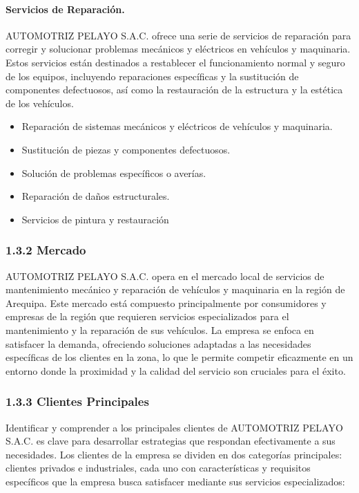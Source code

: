 \paragraph{Servicios de Reparación. }AUTOMOTRIZ PELAYO S.A.C. ofrece una serie de servicios de reparación para corregir y solucionar problemas mecánicos y eléctricos en vehículos y maquinaria. Estos servicios están destinados a restablecer el funcionamiento normal y seguro de los equipos, incluyendo reparaciones específicas y la sustitución de componentes defectuosos, así como la restauración de la estructura y la estética de los vehículos.
\begin{itemize}
    \item Reparación de sistemas mecánicos y eléctricos de vehículos y maquinaria.
    \item Sustitución de piezas y componentes defectuosos.
    \item Solución de problemas específicos o averías.
    \item Reparación de daños estructurales.
    \item Servicios de pintura y restauración
\end{itemize}

\subsubsection*{1.3.2 Mercado}
AUTOMOTRIZ PELAYO S.A.C. opera en el mercado local de servicios de mantenimiento mecánico y reparación de vehículos y maquinaria en la región de Arequipa. Este mercado está compuesto principalmente por consumidores y empresas de la región que requieren servicios especializados para el mantenimiento y la reparación de sus vehículos. La empresa se enfoca en satisfacer la demanda, ofreciendo soluciones adaptadas a las necesidades específicas de los clientes en la zona, lo que le permite competir eficazmente en un entorno donde la proximidad y la calidad del servicio son cruciales para el éxito.


\subsubsection*{1.3.3 Clientes Principales}
Identificar y comprender a los principales clientes de AUTOMOTRIZ PELAYO S.A.C. es clave para desarrollar estrategias que respondan efectivamente a sus necesidades. Los clientes de la empresa se dividen en dos categorías principales: clientes privados e industriales, cada uno con características y requisitos específicos que la empresa busca satisfacer mediante sus servicios especializados:

